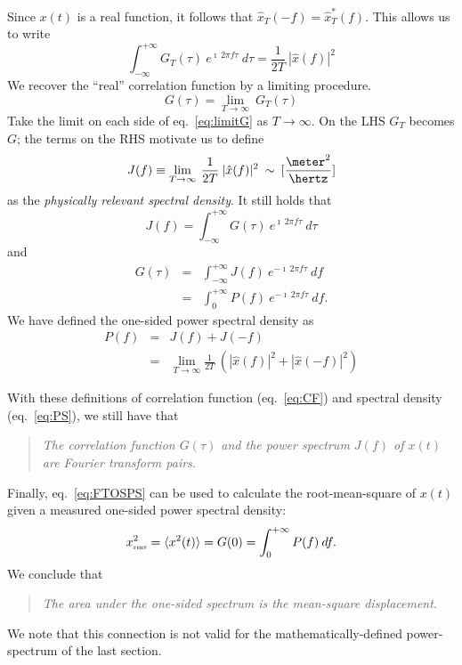 Since $x(t)$ is a real function, it follows that ${\hat{x}}_{T}(-f) = {\hat{x}}^{*}_{T}(f)$.
This allows us to write
\begin{equation}
\int_{-\infty}^{+\infty} G_{T}(\tau) \: e^{\imath \: 2 \pi f \tau} \: d\tau = \frac{1}{2 T} \: | \hat{x}(f) |^{2}
\label{eq:limitG}
\end{equation}
We recover the ``real'' correlation function by a limiting procedure.
\begin{equation}
G(\tau) = \lim_{T \rightarrow \infty} \: G_{T}(\tau)
\end{equation}
Take the limit on each side of eq.~\ref{eq:limitG} as $T \rightarrow
\infty$.  On the LHS $G_T$ becomes $G$; the terms on the RHS motivate
us to define
\begin{equation}
J(f) \equiv \lim_{T \rightarrow \infty} \: \frac{1}{2 T} \: | \hat{x}(f) |^{2} \: \sim \: [\frac{\meter^2}{\hertz}]
\label{eq:PS}
\end{equation}
as the \emph{physically relevant spectral density}.  It still holds that
\begin{equation}
J(f) = \int_{-\infty}^{+\infty} G(\tau) \: e^{\imath \: 2 \pi f \tau} \: d\tau
\end{equation}
and
\begin{eqnarray}
G(\tau) & = & \int_{-\infty}^{+\infty} J(f) \: e^{-\imath \: 2 \pi f \tau} \: df \\
        & = & \int_{0}^{+\infty} P(f) \: e^{-\imath \: 2 \pi f \tau} \: df.
\label{eq:FTOSPS}
\end{eqnarray}
We have defined the one-sided power spectral density as
\begin{eqnarray}
P(f) & = & J(f) + J(-f) \\
     & = & \lim_{T \rightarrow \infty} \frac{1}{2 T} \: ( | \hat{x}(f) |^{2} + | \hat{x}(-f) |^{2})
\label{eq:OSPS}
\end{eqnarray}

With these definitions of correlation function (eq.~\ref{eq:CF}) and
spectral density (eq.~\ref{eq:PS}), we still have that
\begin{quote}
  \emph{The correlation function $G(\tau)$ and the power spectrum $J(f)$ of $x(t)$ are Fourier
  transform pairs.}
\end{quote}

Finally, eq.~\ref{eq:FTOSPS} can be used to calculate the
root-mean-square of $x(t)$ given a measured one-sided power spectral
density:
\begin{equation}
x_{\mbox{\tiny rms}}^2 = \langle x^2(t) \rangle = G(0) = \int_{0}^{+\infty} P(f) \: df.
\label{eq:xrmsP}
\end{equation}
We conclude that
\begin{quote}
   \emph{The area under the one-sided spectrum is the mean-square
   displacement}.
\end{quote}
We note that this connection is not valid for the
mathematically-defined power-spectrum of the last section.


